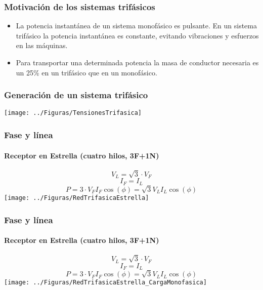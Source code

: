 \documentclass[serif, xcolor=dvipsnames]{beamer}
\begin{document}
\begin{frame}
  \frametitle{Motivación de los sistemas trifásicos}
  \begin{itemize}
  \item La potencia instantánea de un sistema monofásico es
    pulsante. En un sistema trifásico la potencia instantánea es
    constante, evitando vibraciones y esfuerzos en las máquinas.
  \item Para transportar una determinada potencia la masa de conductor
    necesaria es un 25\% en un trifásico que en un monofásico.
  \end{itemize}

\end{frame}
\begin{frame}[plain]
  \frametitle{Generación de un sistema trifásico}

  \begin{center}
    \texttt{[image: ../Figuras/TensionesTrifasica]}
    \par\end{center}


\end{frame}
\begin{frame}[plain]
  \frametitle{Fase y línea}


  \framesubtitle{Receptor en Estrella (cuatro hilos, 3F+1N)}
  \begin{block} {}

    \begin{center}
      \[
      V_{L}=\sqrt{3}\cdot V_{F}
      \]
      \[
      I_{F}=I_{L}
      \]
      \[
      P=3\cdot V_{F}I_{F}\cos(\phi)=\sqrt{3}V_{L}I_{L}\cos(\phi)
      \]
      \texttt{[image: ../Figuras/RedTrifasicaEstrella]}
      \par\end{center}

  \end{block}

\end{frame}
\begin{frame}[plain]
  \frametitle{Fase y línea}


  \framesubtitle{Receptor en Estrella (cuatro hilos, 3F+1N)}
  \begin{block} {}

    \begin{center}
      \[
      V_{L}=\sqrt{3}\cdot V_{F}
      \]
      \[
      I_{F}=I_{L}
      \]
      \[
      P=3\cdot V_{F}I_{F}\cos(\phi)=\sqrt{3}V_{L}I_{L}\cos(\phi)
      \]
      \texttt{[image: ../Figuras/RedTrifasicaEstrella\_CargaMonofasica]}
      \par\end{center}

  \end{block}

\end{frame}
\end{document}
